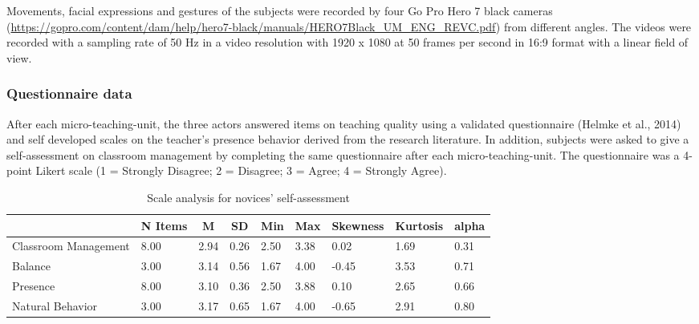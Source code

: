 \documentclass[
  man,floatsintext]{apa6}
\begin{document}
Movements, facial expressions and gestures of the subjects were recorded by four Go Pro Hero 7 black cameras (\url{https://gopro.com/content/dam/help/hero7-black/manuals/HERO7Black_UM_ENG_REVC.pdf}) from different angles. The videos were recorded with a sampling rate of 50 Hz in a video resolution with 1920 x 1080 at 50 frames per second in 16:9 format with a linear field of view.

\hypertarget{questionnaire-data}{%
\subsubsection{Questionnaire data}\label{questionnaire-data}}

After each micro-teaching-unit, the three actors answered items on teaching quality using a validated questionnaire (Helmke et al., 2014) and self developed scales on the teacher's presence behavior derived from the research literature. In addition, subjects were asked to give a self-assessment on classroom management by completing the same questionnaire after each micro-teaching-unit. The questionnaire was a 4-point Likert scale (1 = Strongly Disagree; 2 = Disagree; 3 = Agree; 4 = Strongly Agree).

\begin{table}[h]

\begin{center}
\begin{threeparttable}

\caption{\label{tab:presence_questionnaire_novices}Scale analysis for novices' self-assessment}

\tiny{

\begin{tabular}{lllllllll}
\toprule
 & \multicolumn{1}{c}{N Items} & \multicolumn{1}{c}{M} & \multicolumn{1}{c}{SD} & \multicolumn{1}{c}{Min} & \multicolumn{1}{c}{Max} & \multicolumn{1}{c}{Skewness} & \multicolumn{1}{c}{Kurtosis} & \multicolumn{1}{c}{alpha}\\
\midrule
Classroom Management & 8.00 & 2.94 & 0.26 & 2.50 & 3.38 & 0.02 & 1.69 & 0.31\\
Balance & 3.00 & 3.14 & 0.56 & 1.67 & 4.00 & -0.45 & 3.53 & 0.71\\
Presence & 8.00 & 3.10 & 0.36 & 2.50 & 3.88 & 0.10 & 2.65 & 0.66\\
Natural Behavior & 3.00 & 3.17 & 0.65 & 1.67 & 4.00 & -0.65 & 2.91 & 0.80\\
\bottomrule
\end{tabular}

}

\end{threeparttable}
\end{center}

\end{table}
\end{document}
